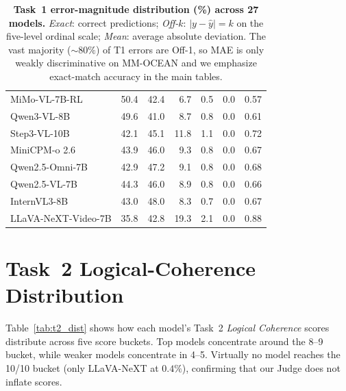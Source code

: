 \documentclass{llmxive}
\providecommand{\benchname}{MM-OCEAN}
\begin{document}
\begin{table}[t]
{\begin{tabular}{lrrrrrr}
MiMo-VL-7B-RL        & 50.4 & 42.4 &  6.7 &  0.5 &  0.0 & 0.57 \\
Qwen3-VL-8B          & 49.6 & 41.0 &  8.7 &  0.8 &  0.0 & 0.61 \\
Step3-VL-10B         & 42.1 & 45.1 & 11.8 &  1.1 &  0.0 & 0.72 \\
MiniCPM-o 2.6        & 43.9 & 46.0 &  9.3 &  0.8 &  0.0 & 0.67 \\
Qwen2.5-Omni-7B      & 42.9 & 47.2 &  9.1 &  0.8 &  0.0 & 0.68 \\
Qwen2.5-VL-7B        & 44.3 & 46.0 &  8.9 &  0.8 &  0.0 & 0.66 \\
InternVL3-8B         & 43.0 & 48.0 &  8.3 &  0.7 &  0.0 & 0.67 \\
LLaVA-NeXT-Video-7B  & 35.8 & 42.8 & 19.3 &  2.1 &  0.0 & 0.88 \\
\bottomrule
\end{tabular}%
}
\caption{\textbf{Task~1 error-magnitude distribution (\%) across 27 models.} \emph{Exact}: correct predictions; \emph{Off-$k$}: $|y-\hat{y}|=k$ on the five-level ordinal scale; \emph{Mean}: average absolute deviation. The vast majority ($\sim\!80\%$) of T1 errors are Off-1, so MAE is only weakly discriminative on \benchname{} and we emphasize exact-match accuracy in the main tables.}
\label{tab:offn}
\end{table}

\section{Task~2 Logical-Coherence Distribution}
\label{app:t2_dist}

Table~\ref{tab:t2_dist} shows how each model's Task~2 \emph{Logical Coherence} scores distribute across five score buckets. Top models concentrate around the 8--9 bucket, while weaker models concentrate in 4--5. Virtually no model reaches the 10/10 bucket (only LLaVA-NeXT at $0.4\%$), confirming that our Judge does not inflate scores.
\end{document}
